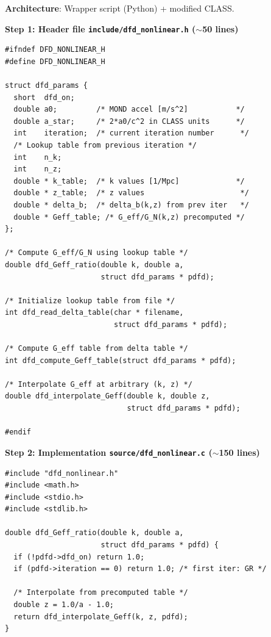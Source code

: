 \documentclass[11pt]{article}
\theoremstyle{definition}
\theoremstyle{remark}
\begin{document}
\begin{tcolorbox}[colback=green!5!white, colframe=green!60!black,
  title=\textbf{NONLINEAR DFD CLASS: Complete Coding Specification}]

\textbf{Architecture}: Wrapper script (Python) + modified CLASS.

\textbf{Step 1: Header file \texttt{include/dfd\_nonlinear.h}
($\sim$50 lines)}

\begin{lstlisting}[caption={dfd\_nonlinear.h --- header for nonlinear DFD},numbers=none]
#ifndef DFD_NONLINEAR_H
#define DFD_NONLINEAR_H

struct dfd_params {
  short  dfd_on;
  double a0;         /* MOND accel [m/s^2]           */
  double a_star;     /* 2*a0/c^2 in CLASS units      */
  int    iteration;  /* current iteration number      */
  /* Lookup table from previous iteration */
  int    n_k;
  int    n_z;
  double * k_table;  /* k values [1/Mpc]             */
  double * z_table;  /* z values                      */
  double * delta_b;  /* delta_b(k,z) from prev iter   */
  double * Geff_table; /* G_eff/G_N(k,z) precomputed */
};

/* Compute G_eff/G_N using lookup table */
double dfd_Geff_ratio(double k, double a,
                      struct dfd_params * pdfd);

/* Initialize lookup table from file */
int dfd_read_delta_table(char * filename,
                         struct dfd_params * pdfd);

/* Compute G_eff table from delta table */
int dfd_compute_Geff_table(struct dfd_params * pdfd);

/* Interpolate G_eff at arbitrary (k, z) */
double dfd_interpolate_Geff(double k, double z,
                            struct dfd_params * pdfd);

#endif
\end{lstlisting}

\textbf{Step 2: Implementation \texttt{source/dfd\_nonlinear.c}
($\sim$150 lines)}

\begin{lstlisting}[caption={dfd\_nonlinear.c --- core implementation},numbers=none]
#include "dfd_nonlinear.h"
#include <math.h>
#include <stdio.h>
#include <stdlib.h>

double dfd_Geff_ratio(double k, double a,
                      struct dfd_params * pdfd) {
  if (!pdfd->dfd_on) return 1.0;
  if (pdfd->iteration == 0) return 1.0; /* first iter: GR */

  /* Interpolate from precomputed table */
  double z = 1.0/a - 1.0;
  return dfd_interpolate_Geff(k, z, pdfd);
}


\end{lstlisting}
\end{tcolorbox}
\end{document}
